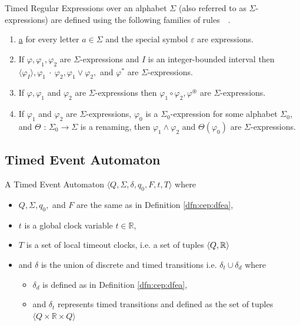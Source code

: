 		\begin{dfn}
			\label{dfn:cep:tre}
			Timed Regular Expressions over an alphabet $\Sigma$ (also referred to as $\Sigma$-expressions)
			are defined using the following families of rules~\citep{tre}~.
			\begin{enumerate}
				\item \underline{a} for every letter $a \in \Sigma$ and the special symbol $\varepsilon$ are expressions.
				\item If $\varphi, \varphi_1, \varphi_2$ are $\Sigma$-expressions and $I$ is an integer-bounded interval then
					$\langle\varphi_I\rangle, \varphi_1~\cdot~\varphi_2, \varphi_1 \vee \varphi_2,$ and $\varphi^\ast$ are $\Sigma$-expressions.
				\item If $\varphi, \varphi_1$ and $\varphi_2$ are $\Sigma$-expressions then $\varphi_1 \circ \varphi_2, \varphi^\circledast$ are
					$\Sigma$-expressions.
				\item If $\varphi_1$ and $\varphi_2$ are $\Sigma$-expressions, $\varphi_0$ is a $\Sigma_0$-expression
					for some alphabet $\Sigma_0$, and $\Theta$ : $\Sigma_0 \rightarrow \Sigma$ is
					a renaming, then $\varphi_1 \wedge \varphi_2$ and $\Theta(\varphi_0)$ are $\Sigma$-expressions.
			\end{enumerate}
		\end{dfn}
		
		\subsection{Timed Event Automaton}
			\begin{dfn}
				\label{dfn:cep:TEA}
				A Timed Event Automaton $\langle Q,\Sigma,\delta,q_0, F, t, T \rangle$ where
				\begin{itemize}
					\item $Q, \Sigma, q_0,$ and $F$ are the same as in Definition \ref{dfn:cep:dfea},
					\item $t$ is a global clock variable $t \in \mathbb{R}$,
					\item $T$ is a set of local timeout clocks, i.e. a set of tuples $\langle Q, \mathbb{R} \rangle$
					\item and $\delta$ is the union of discrete and timed transitions i.e. $\delta_t \cup \delta_d$ where
					\begin{itemize}
						\item $\delta_d$ is defined as in Definition \ref{dfn:cep:dfea},
						\item and $\delta_t$ represents timed transitions and defined as the set of tuples $\langle Q \times \mathbb{R} \times Q \rangle$ 
					\end{itemize}
				\end{itemize}
			\end{dfn}
			
